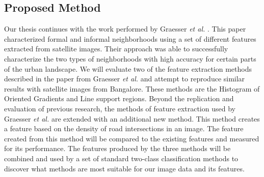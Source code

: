 \subsection{Proposed Method}

Our thesis continues with the work performed by Graesser \textit{et al.} \cite{graesser2012image}. This paper characterized formal and informal neighborhoods using a set of different features extracted from satellite images. Their approach was able to successfully characterize the two types of neighborhoods with high accuracy for certain parts of the urban landscape. We will evaluate two of the feature extraction methods described in the paper from Graesser \textit{et al.} and attempt to reproduce similar results with satellite images from Bangalore. These methods are the Histogram of Oriented Gradients and Line support regions. Beyond the replication and evaluation of previous research, the methods of feature extraction used by Graesser \textit{et al.} are extended with an additional new method. This method creates a feature based on the density of road intersections in an image. The feature created from this method will be compared to the existing features and measured for its performance. The features produced by the three methods will be combined and used by a set of standard two-class classification methods to discover what methods are most suitable for our image data and its features. 

